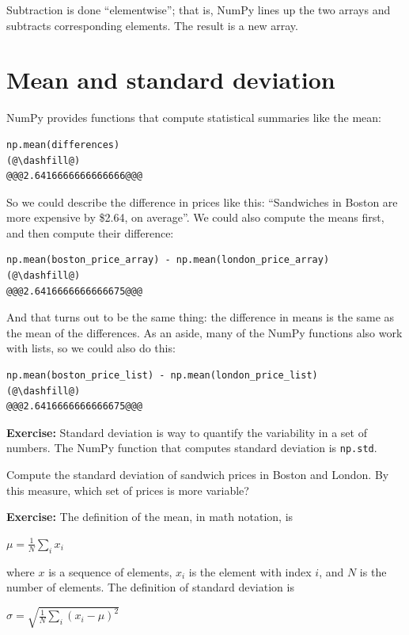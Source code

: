 Subtraction is done ``elementwise''; that is, NumPy lines up the two
arrays and subtracts corresponding elements. The result is a new array.

\hypertarget{mean-and-standard-deviation}{%
\section{Mean and standard
deviation}\label{mean-and-standard-deviation}}

NumPy provides functions that compute statistical summaries like the
mean:

\begin{lstlisting}[]
np.mean(differences)
(@\dashfill@)
@@@2.6416666666666666@@@
\end{lstlisting}

So we could describe the difference in prices like this: ``Sandwiches in
Boston are more expensive by \$2.64, on average''. We could also compute
the means first, and then compute their difference:

\begin{lstlisting}[]
np.mean(boston_price_array) - np.mean(london_price_array)
(@\dashfill@)
@@@2.6416666666666675@@@
\end{lstlisting}

And that turns out to be the same thing: the difference in means is the
same as the mean of the differences. As an aside, many of the NumPy
functions also work with lists, so we could also do this:

\begin{lstlisting}[]
np.mean(boston_price_list) - np.mean(london_price_list)
(@\dashfill@)
@@@2.6416666666666675@@@
\end{lstlisting}

\textbf{Exercise:} Standard deviation is way to quantify the variability
in a set of numbers. The NumPy function that computes standard deviation
is \passthrough{\lstinline!np.std!}.

Compute the standard deviation of sandwich prices in Boston and London.
By this measure, which set of prices is more variable?

\textbf{Exercise:} The definition of the mean, in math notation, is

\(\mu = \frac{1}{N} \sum_i x_i\)

where \(x\) is a sequence of elements, \(x_i\) is the element with index
\(i\), and \(N\) is the number of elements. The definition of standard
deviation is

\(\sigma = \sqrt{\frac{1}{N} \sum_i (x_i - \mu)^2}\)


